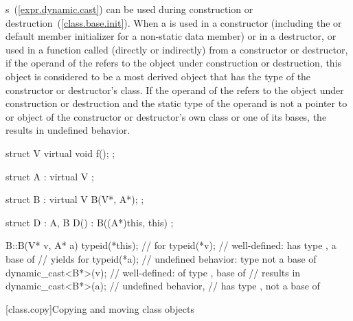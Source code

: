 \pnum
{}%
%
%
%
s~(\ref{expr.dynamic.cast}) can be used during construction
or destruction~(\ref{class.base.init}). When a
is used in a constructor (including the
 or default member initializer
for a non-static data member)
or in a destructor, or used in a function called (directly or indirectly) from
a constructor or destructor, if the operand of the
refers to the object under construction or destruction, this object is
considered to be a most derived object that has the type of the constructor or
destructor's class.
If the operand of the
refers to the object under construction or destruction and the static type of
the operand is not a pointer to or object of the constructor or destructor's
own class or one of its bases, the
results in undefined behavior.

\enterexample

\begin{codeblock}
struct V {
  virtual void f();
};

struct A : virtual V { };

struct B : virtual V {
  B(V*, A*);
};

struct D : A, B {
  D() : B((A*)this, this) { }
};

B::B(V* v, A* a) {
  typeid(*this);                //  for 
  typeid(*v);                   // well-defined:  has type , a base of 
                                // yields  for 
  typeid(*a);                   // undefined behavior: type  not a base of 
  dynamic_cast<B*>(v);          // well-defined:  of type ,  base of 
                                // results in 
  dynamic_cast<B*>(a);          // undefined behavior,
                                //  has type ,  not a base of 
}
\end{codeblock}
\exitexample%
%

[class.copy]{Copying and moving class objects}%
%
%
%
%
%

